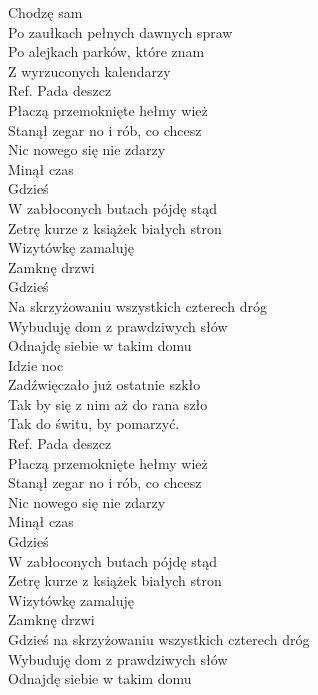 
Chodzę sam \tab{}\tab{} \\
Po zaułkach pełnych dawnych spraw\\
Po alejkach parków, które znam  \\
Z wyrzuconych kalendarzy \tab{}  \\
\hops
Ref. Pada deszcz \tab{} \\
 Płaczą przemoknięte hełmy wież \\
 Stanął zegar no i rób, co chcesz \\
 Nic nowego się nie zdarzy  \\
 Minął czas  \tab{}\\
 Gdzieś  \tab{} \tab{}\\
 W zabłoconych butach pójdę stąd \\
 Zetrę kurze z książek białych stron  \\
 Wizytówkę zamaluję  \tab{}\\
 Zamknę drzwi  \tab{} \\
 Gdzieś   \tab{} \tab{} \tab{} \\
 Na skrzyżowaniu wszystkich czterech dróg  \\
 Wybuduję dom z prawdziwych słów  \tab{}\\
 Odnajdę siebie w takim domu \tab{}  \\
\hops
Idzie noc \\
Zadźwięczało już ostatnie szkło \\
Tak by się z nim aż do rana szło \\
Tak do świtu, by pomarzyć.  \\
\hops
Ref. Pada deszcz  \\
 Płaczą przemoknięte hełmy wież \\
 Stanął zegar no i rób, co chcesz \\
 Nic nowego się nie zdarzy \\
 Minął czas  \\
 Gdzieś  \\
 W zabłoconych butach pójdę stąd \\
 Zetrę kurze z książek białych stron  \\
 Wizytówkę zamaluję\\
 Zamknę drzwi\\
 Gdzieś na skrzyżowaniu wszystkich czterech dróg \\
 Wybuduję dom z prawdziwych słów \\
 Odnajdę siebie w takim domu